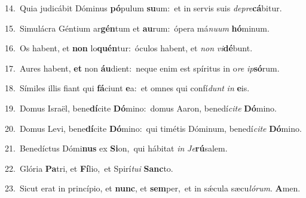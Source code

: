 {\numbfont\textcolor{\numbcolor}{14.}}~Quia judicábit Dóminus \textbf{pó}\-pulum \textbf{su}\-um:~\star et in servis suis \textit{de}\-\textit{pre}\textbf{cá}bitur.\par
{\numbfont\textcolor{\numbcolor}{15.}}~Simulácra Géntium ar\-\textbf{gén}\-tum et \textbf{au}\-rum:~\star ópera má\-\textit{nu}\-\textit{um} \textbf{hó}\-minum.\par
{\numbfont\textcolor{\numbcolor}{16.}}~Os habent, et \textbf{non} lo\-\textbf{quén}\-tur:~\star óculos habent, et \textit{non} \textit{vi}\-\textbf{dé}bunt.\par
{\numbfont\textcolor{\numbcolor}{17.}}~Aures habent, \textbf{et} non \textbf{áu}\-dient:~\star neque enim est spíritus in o\textit{re} \textit{ip}\-\textbf{só}rum.\par
{\numbfont\textcolor{\numbcolor}{18.}}~Símiles illis fiant qui \textbf{fá}\-ciunt \textbf{e}\-a:~\star et omnes qui confí\textit{dunt} \textit{in} \textbf{e}\-is.\par
{\numbfont\textcolor{\numbcolor}{19.}}~Domus Israël, bene\-\textbf{dí}\-cite \textbf{Dó}\-mino:~\star domus Aaron, benedí\-\textit{ci}\-\textit{te} \textbf{Dó}\-mino.\par
{\numbfont\textcolor{\numbcolor}{20.}}~Domus Levi, bene\-\textbf{dí}\-cite \textbf{Dó}\-mino:~\star qui timétis Dóminum, benedí\-\textit{ci}\-\textit{te} \textbf{Dó}\-mino.\par
{\numbfont\textcolor{\numbcolor}{21.}}~Benedíctus Dómi\textbf{nus} ex \textbf{Si}\-on,~\star qui hábitat \textit{in} \textit{Je}\-\textbf{rú}salem.\par
{\numbfont\textcolor{\numbcolor}{22.}}~Glória \textbf{Pa}\-tri, et \textbf{Fí}\-lio,~\star et Spirí\-\textit{tu}\-\textit{i} \textbf{Sanc}\-to.\par
{\numbfont\textcolor{\numbcolor}{23.}}~Sicut erat in princípio, et \textbf{nunc}\-, et \textbf{sem}\-per,~\star et in sǽcula sæcu\-\textit{ló}\-\textit{rum}. \textbf{A}\-men.\par
